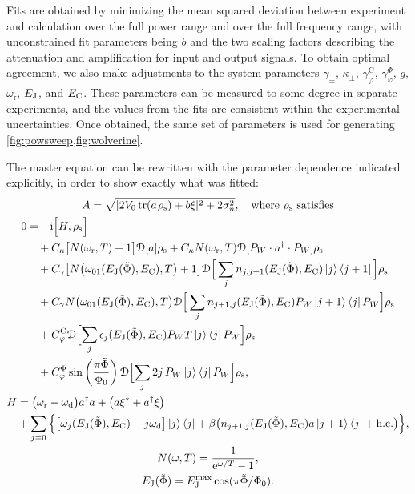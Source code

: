 Fits are obtained by minimizing the mean squared deviation between experiment and calculation over the full power range and over the full frequency range, with unconstrained fit parameters being $b$ and the two scaling factors describing the attenuation and amplification for input and output signals. To obtain optimal agreement, we also make adjustments to the system parameters $\gamma_\pm$, $\kappa_\pm$, $\gamma_\varphi^{\text{C}}$, $\gamma_\varphi^{\Phi}$, $g$, $\omega_\text{r}$, $E_{\text{J}}$, and $E_{\text{C}}$. These parameters can be measured to some degree in separate experiments, and the values from the fits are consistent within the experimental uncertainties. Once obtained, the same set of parameters is used for generating \cref{fig:powsweep,fig:wolverine}.

The master equation  can be rewritten with the parameter dependence indicated explicitly, in order to show exactly what was fitted:
\begin{subequations}\label{eq:transmasterexplicit}
\begin{gather}
    A=\sqrt{\lvert 2\amp\tr(a\mspace{1.5mu}\rho_\text{s}) + b \xi \rvert^2 + 2 \sigma_n^2},\quad\text{where $\rho_\text{s}$ satisfies}\\
    \begin{split}
    0&=-\rmi\Bigl[H,\rho_\text{s}\Bigr]\\
        &\quad+C_\kappa\big[N(\omr,T)+1\big]\DD[a]\rho_\text{s}
            + C_\kappa N(\omr,T)\DD[P_W\cdot a\dg\cdot P_W]\rho_\text{s}\\
        &\quad+C_\gamma\big[N\bm{\bigl(}\omega_{01}(\EJ(\tPhi),\EC),T\bm{\bigr)}+1\big]\DD\Big[\sum_j n_{j,j+1}(\EJ(\tPhi),\EC)\ket{j}\bra{j+1}\Big]\rho_\text{s}\\
        &\quad+C_\gamma N\bm{\bigl(}\omega_{01}(\EJ(\tPhi),\EC),T\bm{\bigr)}\DD\Big[\sum_j n_{j+1,j}(\EJ(\tPhi),\EC)
        P_W \ket{j+1}\bra{j} P_W\Big]\rho_\text{s}\\
        &\quad+C_\varphi^\text{C}
            \DD\Bigl[\sum_j\epsilon_j(\EJ(\tPhi),\EC) P_WT\ket{j}\bra{j}P_W\Bigr]\rho_\text{s}\\
        &\quad+C_\varphi^\Phi \sin\left(\frac{\pi\tPhi}{\Phi_0}\right)\DD\Bigl[\sum_j 2j\, P_W\ket{j}\bra{j}P_W\Bigr]\rho_\text{s} ,
    \end{split}\\
    \begin{split}\label{eq:HJCexplicit}
    H&=\big(\omr-\omd\big)a\dg a + \bigl(a\xi^*+a\dg\xi\bigr)\\
            &+\sum_{j=0}\Big\{\big[\omega_j(\EJ(\tPhi),\EC)-j\omd\big]\ket{j}\bra{j}
            +\beta\bigl(n_{j+1,j}(\EJ(\tPhi),\EC)a\ket{j+1}\bra{j}+\hc \bigr)\Big\} ,
    \end{split}\raisetag{2\baselineskip}\\
    N(\omega,T)=\frac{1}{\rme^{\omega/T}-1} ,\\
    \EJ(\tPhi)=\EJ^\text{max}\cos(\pi\tPhi/\Phi_0) .
\end{gather}
\end{subequations}
